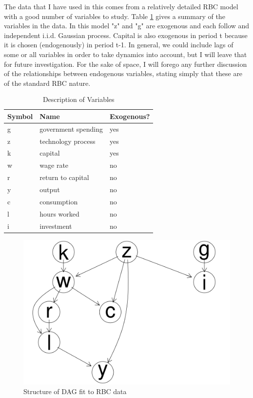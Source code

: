 \documentclass{article}
\begin{document}
The data that I have used in this comes from a relatively detailed RBC model with a good number of variables to study. Table \ref{tab1} gives a summary of the variables in the data. In this model "z" and "g" are exogenous and each follow and independent i.i.d. Gaussian process. Capital is also exogenous in period t because it is chosen (endogenously) in period t-1. In general, we could include lags of some or all variables in order to take dynamics into account, but I will leave that for future investigation. For the sake of space, I will forego any further discussion of the relationships between endogenous variables, stating simply that these are of the standard RBC nature.

\begin{table}
  \centering
  \begin{tabular}{|l|l|l|}
    \hline
    Symbol & Name & Exogenous? \\
    \hline
    g & government spending & yes \\
    z & technology process & yes \\
    k & capital & yes \\
    w & wage rate & no \\
    r & return to capital & no \\
    y & output & no \\
    c & consumption & no \\
    l & hours worked & no \\
    i & investment & no \\ \cline{2-2}
    \hline
  \end{tabular}
  \caption{Description of Variables}
  \label{tab1}
\end{table}

\begin{figure}
  \centering
  \includegraphics[width=\textwidth, height=0.25\textheight, keepaspectratio]{images/rbc_dag.png}
  \caption{Structure of DAG fit to RBC data}
  \label{rbcdag}
\end{figure}
\end{document}
